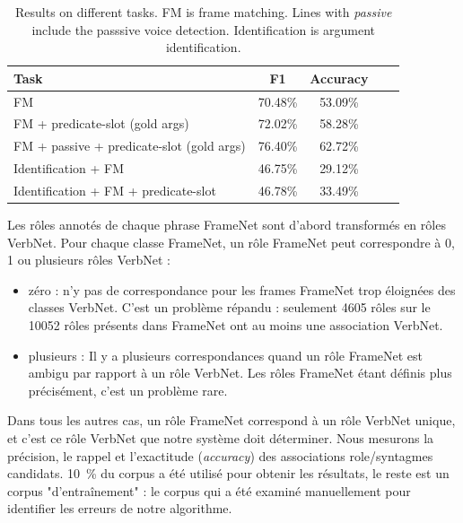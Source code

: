 \begin{table}[ht]
    \centering
    \begin{tabular}{lcccc}
        \toprule
        Task                                           & F1        & Accuracy \\
        \midrule
        FM                                             & 70.48\%   & 53.09\%  \\
        FM + predicate-slot (gold args)                & 72.02\%   & 58.28\%  \\
        FM + passive + predicate-slot (gold args)      & 76.40\%   & 62.72\%  \\
        \midrule
        Identification + FM                            & 46.75\%   & 29.12\%  \\
        Identification + FM + predicate-slot           & 46.78\%   & 33.49\%  \\
        \bottomrule
    \end{tabular}
    \caption{\protect\centering\label{table:results}Results on different tasks. FM is frame matching. Lines with \emph{passive} include the passsive voice detection. Identification is argument identification.}
\end{table}

Les rôles annotés de chaque phrase FrameNet sont d'abord transformés en rôles
VerbNet. Pour chaque classe FrameNet, un rôle FrameNet peut correspondre à 0, 1
ou plusieurs rôles VerbNet :

\begin{itemize}

    \item zéro : n'y pas de correspondance pour les frames FrameNet trop éloignées
    des classes VerbNet. C'est un problème répandu :  seulement 4605 rôles sur le
    10052 rôles présents dans FrameNet ont au moins une association VerbNet.

    \item plusieurs : Il y a plusieurs correspondances quand un rôle FrameNet
    est ambigu par rapport à un rôle VerbNet. Les rôles FrameNet étant définis plus
    précisément, c'est un problème rare. %

\end{itemize}

Dans tous les autres cas, un rôle FrameNet correspond à un rôle VerbNet unique,
et c'est ce rôle VerbNet que notre système doit déterminer. Nous mesurons la
précision, le rappel et l'exactitude (\emph{accuracy}) des associations
role/syntagmes candidats.  10~\% du corpus a été utilisé pour obtenir les
résultats, le reste est un corpus "d'entraînement" : le corpus qui a été
examiné manuellement pour identifier les erreurs de notre algorithme.

